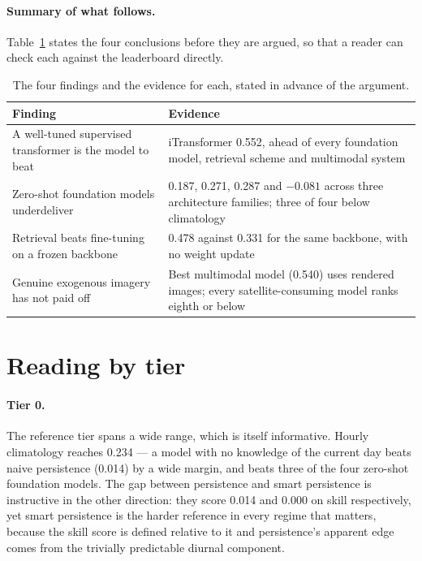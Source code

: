 \paragraph{Summary of what follows.} Table~\ref{tab:findings} states the four conclusions
before they are argued, so that a reader can check each against the leaderboard directly.

\begin{table}[h!]
\centering
\small
\begin{tabular}{p{5.4cm} p{8.0cm}}
\hline
\textbf{Finding} & \textbf{Evidence} \\
\hline
A well-tuned supervised transformer is the model to beat &
iTransformer 0.552, ahead of every foundation model, retrieval scheme and multimodal system \\
Zero-shot foundation models underdeliver &
0.187, 0.271, 0.287 and $-0.081$ across three architecture families; three of four below
climatology \\
Retrieval beats fine-tuning on a frozen backbone &
0.478 against 0.331 for the same backbone, with no weight update \\
Genuine exogenous imagery has not paid off &
Best multimodal model (0.540) uses rendered images; every satellite-consuming model ranks
eighth or below \\
\hline
\end{tabular}
\caption{The four findings and the evidence for each, stated in advance of the argument.}
\label{tab:findings}
\end{table}

\section{Reading by tier}
\label{sec:by-tier}

\paragraph{Tier 0.} The reference tier spans a wide range, which is itself informative.
Hourly climatology reaches 0.234 --- a model with no knowledge of the current day beats
naive persistence (0.014) by a wide margin, and beats three of the four zero-shot foundation
models. The gap between persistence and smart persistence is instructive in the other
direction: they score 0.014 and 0.000 on skill respectively, yet smart persistence is the
harder reference in every regime that matters, because the skill score is defined relative
to it and persistence's apparent edge comes from the trivially predictable diurnal
component.

